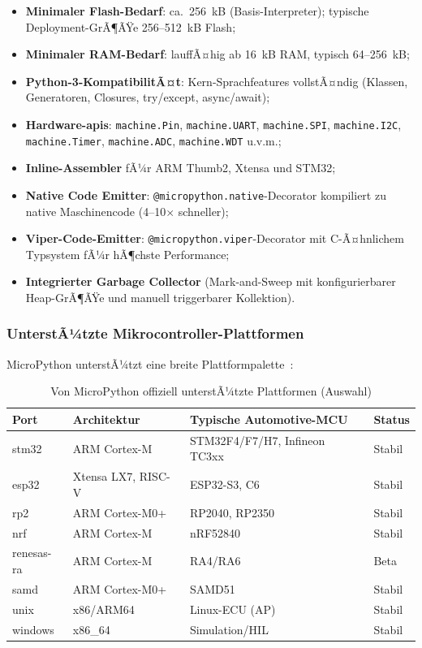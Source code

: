 ﻿\documentclass[12pt,a4paper,twoside]{article}
\begin{document}
\begin{itemize}
  \item \textbf{Minimaler Flash-Bedarf}: ca.\ 256~kB (Basis-Interpreter);
        typische Deployment-GrÃ¶ÃŸe 256--512~kB Flash;
  \item \textbf{Minimaler RAM-Bedarf}: lauffÃ¤hig ab 16~kB RAM,
        typisch 64--256~kB;
  \item \textbf{Python-3-KompatibilitÃ¤t}: Kern-Sprachfeatures vollstÃ¤ndig
        (Klassen, Generatoren, Closures, try/except, async/await);
  \item \textbf{Hardware-\glspl{api}}: \texttt{machine.Pin}, \texttt{machine.UART},
        \texttt{machine.SPI}, \texttt{machine.I2C}, \newline \texttt{machine.Timer},
        \texttt{machine.ADC}, \texttt{machine.WDT} u.v.m.;
  \item \textbf{Inline-Assembler} fÃ¼r ARM Thumb2, Xtensa und STM32;
  \item \textbf{Native Code Emitter}: \texttt{@micropython.native}-Decorator
        kompiliert zu native Maschinencode (4--10$\times$ schneller);
  \item \textbf{Viper-Code-Emitter}: \texttt{@micropython.viper}-Decorator
        mit C-Ã¤hnlichem Typsystem fÃ¼r hÃ¶chste Performance;
  \item \textbf{Integrierter Garbage Collector} (Mark-and-Sweep mit
        konfigurierbarer Heap-GrÃ¶ÃŸe und manuell triggerbarer Kollektion).
\end{itemize}

\subsubsection{UnterstÃ¼tzte Mikrocontroller-Plattformen}
MicroPython unterstÃ¼tzt eine breite Plattformpalette~\cite{micropython_ports2023}:

\begin{table}[h]
\centering
\caption{Von MicroPython offiziell unterstÃ¼tzte Plattformen (Auswahl)}
\label{tab:micropython_platforms}
\begin{tabular}{llll}
\toprule
\textbf{Port} & \textbf{Architektur} & \textbf{Typische Automotive-MCU} & \textbf{Status} \\
\midrule
stm32  & ARM Cortex-M & STM32F4/F7/H7, Infineon TC3xx & Stabil \\
esp32  & Xtensa LX7, RISC-V & ESP32-S3, C6 & Stabil \\
rp2    & ARM Cortex-M0+ & RP2040, RP2350 & Stabil \\
nrf    & ARM Cortex-M & nRF52840 & Stabil \\
renesas-ra & ARM Cortex-M & RA4/RA6 & Beta \\
samd   & ARM Cortex-M0+ & SAMD51 & Stabil \\
unix   & x86/ARM64 & Linux-ECU (AP) & Stabil \\
windows & x86\_64 & Simulation/HIL & Stabil \\
\bottomrule
\end{tabular}
\end{table}
\end{document}
